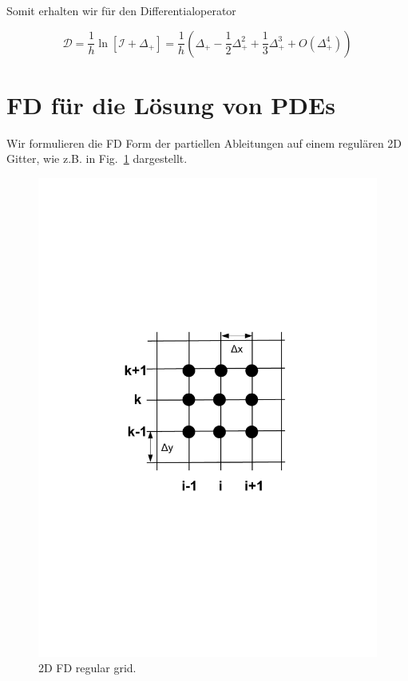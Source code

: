 Somit erhalten wir für den Differentialoperator

\[
\mathcal{D}=\frac{1}{h}\ln[\mathcal{I}+\Delta_+]=
\frac{1}{h}\left({\Delta_+-\frac{1}{2}\Delta_+^2+
\frac{1}{3}\Delta_+^3 +O\left(\Delta_+^4\right)}\right)
\]
\section{FD für die Lösung von PDEs}
Wir formulieren die FD Form der partiellen Ableitungen auf einem regulären 2D
Gitter, wie z.B. in Fig.\ \ref{fig:gridfd2d} dargestellt.

\begin{figure}[!ht]
        \begin{center}
	        \includegraphics[width=.7\textwidth]{fig/GridFD2D.pdf}
        	\caption{2D FD regular grid.\label{fig:gridfd2d}}
        \end{center}
\end{figure}

